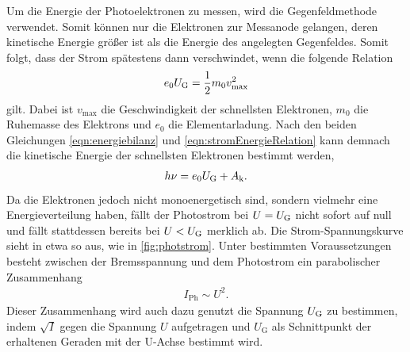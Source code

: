 \noindent
Um die Energie der Photoelektronen zu messen, wird die Gegenfeldmethode verwendet. Somit können nur die Elektronen zur Messanode gelangen, deren kinetische Energie
größer ist als die Energie des angelegten Gegenfeldes. Somit folgt, dass der Strom spätestens dann verschwindet, wenn die folgende Relation 
\begin{align}
    e_0 U_{\text G}=\frac 12 m_0v_{\text{max}}^2
    \label{eqn:stromEnergieRelation}
\end{align}
gilt. Dabei ist $v_{\text{max}}$ die Geschwindigkeit der schnellsten Elektronen, $m_0$ die Ruhemasse des Elektrons und $e_0$ die Elementarladung. Nach den beiden
Gleichungen \eqref{eqn:energiebilanz} und \eqref{eqn:stromEnergieRelation} kann demnach die kinetische Energie der schnellsten Elektronen bestimmt werden,
\begin{align}
    h\nu = e_0 U_{\text G} + A_{\text k}.
    \label{eqn:energieElektr}
\end{align}
Da die Elektronen jedoch nicht monoenergetisch sind, sondern vielmehr eine Energieverteilung haben, fällt der Photostrom bei $U=U_{\text G}$ nicht sofort auf null und fällt
stattdessen bereits bei $U<U_{\text G}$ merklich ab. Die Strom-Spannungskurve sieht in etwa so aus, wie in \autoref{fig:photstrom}. Unter bestimmten Voraussetzungen besteht zwischen der Bremsspannung
und dem Photostrom ein parabolischer Zusammenhang
\begin{align}
    I_{\text{Ph}} \sim U^2.
    \label{eqn:wurzelIGesetz}
\end{align}
Dieser Zusammenhang wird auch dazu genutzt die Spannung $U_{\text G}$ zu bestimmen, indem $\sqrt I$ gegen die Spannung $U$ aufgetragen und $U_{\text{G}}$ 
als Schnittpunkt der erhaltenen Geraden mit der U-Achse bestimmt wird.